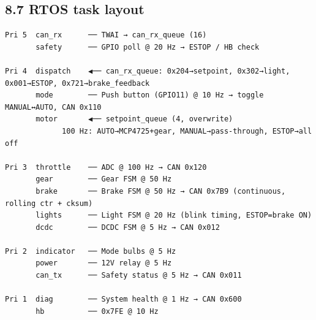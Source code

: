 \subsection{8.7 RTOS task layout}\label{rtos-task-layout-1}

\begin{verbatim}
Pri 5  can_rx      ── TWAI → can_rx_queue (16)
       safety      ── GPIO poll @ 20 Hz → ESTOP / HB check

Pri 4  dispatch    ◀── can_rx_queue: 0x204→setpoint, 0x302→light, 0x001→ESTOP, 0x721→brake_feedback
       mode        ── Push button (GPIO11) @ 10 Hz → toggle MANUAL↔AUTO, CAN 0x110
       motor       ◀── setpoint_queue (4, overwrite)
             100 Hz: AUTO→MCP4725+gear, MANUAL→pass-through, ESTOP→all off

Pri 3  throttle    ── ADC @ 100 Hz → CAN 0x120
       gear        ── Gear FSM @ 50 Hz
       brake       ── Brake FSM @ 50 Hz → CAN 0x7B9 (continuous, rolling ctr + cksum)
       lights      ── Light FSM @ 20 Hz (blink timing, ESTOP=brake ON)
       dcdc        ── DCDC FSM @ 5 Hz → CAN 0x012

Pri 2  indicator   ── Mode bulbs @ 5 Hz
       power       ── 12V relay @ 5 Hz
       can_tx      ── Safety status @ 5 Hz → CAN 0x011

Pri 1  diag        ── System health @ 1 Hz → CAN 0x600
       hb          ── 0x7FE @ 10 Hz
\end{verbatim}

